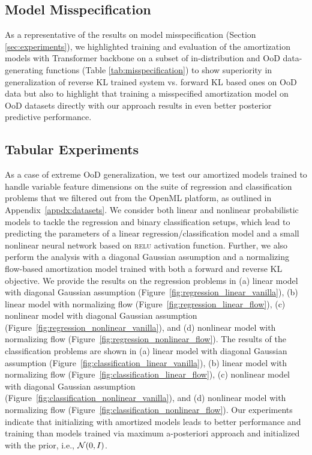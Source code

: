 \subsection{Model Misspecification}
\label{appdx:results_missspecification}
As a representative of the results on model misspecification (Section \ref{sec:experiments}), we highlighted training and evaluation of the amortization models with Transformer backbone on a subset of in-distribution and OoD data-generating functions (Table \ref{tab:misspecification}) to show superiority in generalization of reverse KL trained system vs. forward KL based ones on OoD data but also to highlight that training a misspecified amortization model on OoD datasets directly with our approach results in even better posterior predictive performance.

\subsection{Tabular Experiments}
\label{appdx:results_tabular}
As a case of extreme OoD generalization, we test our amortized models trained to handle variable feature dimensions on the suite of regression and classification problems that we filtered out from the OpenML platform, as outlined in Appendix~\ref{appdx:datasets}. We consider both linear and nonlinear probabilistic models to tackle the regression and binary classification setups, which lead to predicting the parameters of a linear regression/classification model and a small nonlinear neural network based on \textsc{relu} activation function. Further, we also perform the analysis with a diagonal Gaussian assumption and a normalizing flow-based amortization model trained with both a forward and reverse KL objective. We provide the results on the regression problems in (a) linear model with diagonal Gaussian assumption (Figure~\ref{fig:regression_linear_vanilla}), (b) linear model with normalizing flow (Figure~\ref{fig:regression_linear_flow}), (c) nonlinear model with diagonal Gaussian assumption (Figure~\ref{fig:regression_nonlinear_vanilla}), and (d) nonlinear model with normalizing flow (Figure~\ref{fig:regression_nonlinear_flow}). The results of the classification problems are shown in (a) linear model with diagonal Gaussian assumption (Figure~\ref{fig:classification_linear_vanilla}), (b) linear model with normalizing flow (Figure~\ref{fig:classification_linear_flow}), (c) nonlinear model with diagonal Gaussian assumption (Figure~\ref{fig:classification_nonlinear_vanilla}), and (d) nonlinear model with normalizing flow (Figure~\ref{fig:classification_nonlinear_flow}).
Our experiments indicate that initializing with amortized models leads to better performance and training than models trained via maximum a-posteriori approach and initialized with the prior, i.e., ${\mathcal{N}}(0, I)$. 

